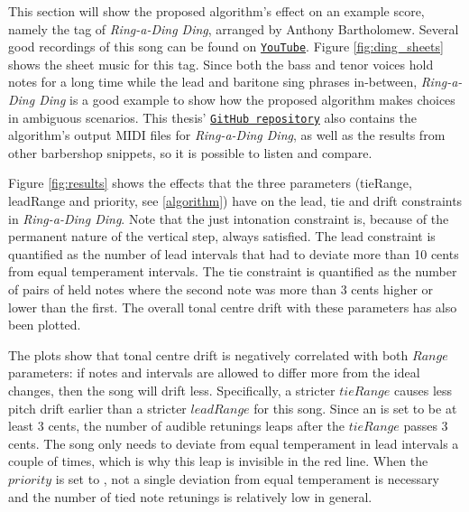 \documentclass[a4paper]{article}
\begin{document}
This section will show the proposed algorithm's effect on an example score, namely the tag of \textit{Ring-a-Ding Ding}, arranged by Anthony Bartholomew. Several good recordings of this song can be found on \texttt{\href{https://www.youtube.com/watch?v=G40I5JDtfjI&t=147s}{YouTube}}. Figure \ref{fig:ding_sheets} shows the sheet music for this tag. \cite{noauthor_barbershop_nodate} Since both the bass and tenor voices hold notes for a long time while the lead and baritone sing phrases in-between, \textit{Ring-a-Ding Ding} is a good example to show how the proposed algorithm makes choices in ambiguous scenarios. This thesis' \texttt{\href{https://github.com/teuncb/adaptivebarbershop}{GitHub repository}} also contains the algorithm's output MIDI files for \textit{Ring-a-Ding Ding}, as well as the results from other barbershop snippets, so it is possible to listen and compare.

Figure \ref{fig:results} shows the effects that the three parameters (tieRange, leadRange and priority, see \ref{algorithm}) have on the lead, tie and drift constraints in \textit{Ring-a-Ding Ding}. Note that the just intonation constraint is, because of the permanent nature of the vertical step, always satisfied. The lead constraint is quantified as the number of lead intervals that had to deviate more than 10 cents from equal temperament intervals. The tie constraint is quantified as the number of pairs of held notes where the second note was more than 3 cents higher or lower than the first. The overall tonal centre drift with these parameters has also been plotted.

The plots show that tonal centre drift is negatively correlated with both $\mathit{Range}$ parameters: if notes and intervals are allowed to differ more from the ideal changes, then the song will drift less. Specifically, a stricter $\mathit{tieRange}$ causes less pitch drift earlier than a stricter $\mathit{leadRange}$ for this song. Since an  is set to be at least 3 cents, the number of audible retunings leaps after the $\mathit{tieRange}$ passes 3 cents. The song only needs to deviate from equal temperament in lead intervals a couple of times, which is why this leap is invisible in the red line. When the $\mathit{priority}$ is set to , not a single deviation from equal temperament is necessary and the number of tied note retunings is relatively low in general.
\end{document}
